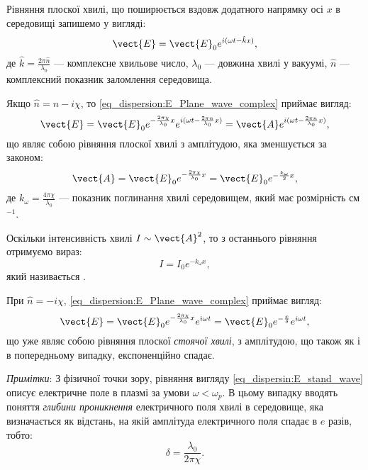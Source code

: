 \begin{solutionexample}
	Рівняння плоскої хвилі, що поширюється вздовж додатного напрямку осі $x$ в середовищі запишемо у вигляді:
	\begin{equation}\label{eq_dispersion:E_Plane_wave_complex}
		\vect{E} = \vect{E}_0 e^{i(\omega t - \hat{k} x)},
	\end{equation}
	де $\hat{k} = \frac{2\pi\hat{n}}{\lambda_0}$ --- комплексне хвильове число, $\lambda_0$ --- довжина хвилі у вакуумі, $\hat{n}$ --- комплексний показник заломлення середовища.

	Якщо $\hat{n} = n - i\chi$, то \eqref{eq_dispersion:E_Plane_wave_complex} приймає вигляд:
	\begin{equation*}
		\vect{E} = \vect{E}_0e^{-\frac{2\pi \chi}{\lambda_0} x} e^{i(\omega t - \frac{2\pi n}{\lambda_0} x)} = \vect{A} e^{i(\omega t - \frac{2\pi n}{\lambda_0} x )},
	\end{equation*}
	що являє собою рівняння плоскої хвилі з амплітудою, яка зменшується за законом:
	\begin{equation*}
		\vect{A} = \vect{E}_0e^{-\frac{2\pi \chi}{\lambda_0} x}  = \vect{E}_0e^{- \frac{k_{\omega}}{2} x},
	\end{equation*}
	де $k_{\omega} = \frac{4\pi\chi}{\lambda_0}$ --- показник поглинання хвилі середовищем, який має розмірність см$^{-1}$.

	Оскільки інтенсивність хвилі $I \sim \vect{A}^2$, то з останнього рівняння отримуємо вираз:
	\begin{equation*}
		I = I_0e^{- k_{\omega} x},
	\end{equation*}
	який називається .

	При $\hat{n} = - i\chi$, \eqref{eq_dispersion:E_Plane_wave_complex} приймає вигляд:
	\begin{equation}\label{eq_dispersin:E_stand_wave}
		\vect{E} = \vect{E}_0e^{-\frac{2\pi \chi}{\lambda_0} x} e^{i\omega t} = \vect{E}_0e^{-\frac{x}{\delta}} e^{i\omega t},
	\end{equation}
	що уже являє собою рівняння плоскої \emph{стоячої хвилі}, з амплітудою, що також як і в попередньому випадку, експоненційно спадає.

	\emph{Примітки}: З фізичної точки зору, рівняння вигляду \eqref{eq_dispersin:E_stand_wave} описує електричне поле в плазмі за умови $\omega < \omega_p$. В цьому випадку вводять поняття \emph{глибини проникнення} електричного поля хвилі в середовище, яка визначається як відстань, на якій амплітуда електричного поля спадає в $e$ разів, тобто:
	\begin{equation*}
		\delta = \frac{\lambda_0}{2\pi\chi}.
	\end{equation*}


\end{solutionexample}

